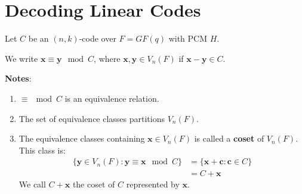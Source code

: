 \section{Decoding Linear Codes}
Let $ C $ be an $ (n,k) $-code over $ F=GF(q) $ with PCM $ H $.

\begin{defbox}
    \begin{definition}
        We write $ \bm{x}\equiv \bm{y} \mod C $, where $ \bm{x},\bm{y}\in V_n(F) $
        if $ \bm{x}-\bm{y}\in C $.
    \end{definition}
\end{defbox}

\textbf{Notes}:
\begin{enumerate}[(1)]
    \item $ \equiv\mod C $ is an equivalence relation.
    \item The set of equivalence classes partitions $ V_n(F) $.
    \item The equivalence classes containing $ \bm{x}\in V_n(F) $
          is called a \textbf{coset} of $ V_n(F) $. This class is:
          \begin{align*}
              \{\bm{y}\in V_n(F):\bm{y}\equiv \bm{x}\mod C\}
               & =\{\bm{x}+\bm{c}:\bm{c}\in C\} \\
               & =C+\bm{x}
          \end{align*}
          We call $ C+\bm{x} $ the coset of $ C $ represented by $ \bm{x} $.
\end{enumerate}


